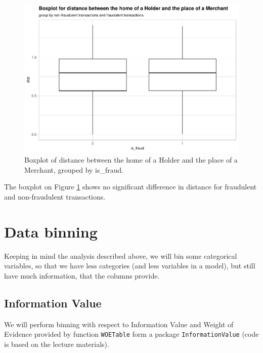 \documentclass[
]{report}
\begin{document}
\begin{figure}
\centering
\includegraphics{credit_card_fraud_detection_files/figure-latex/dist_plot-1.pdf}
\caption{\label{Fig:dist_plot}Boxplot of distance between the home of a
Holder and the place of a Merchant, grouped by is\_fraud.}
\end{figure}

The boxplot on Figure \ref{Fig:dist_plot} shows no significant
difference in distance for fraudulent and non-fraudulent transactions.

\hypertarget{data-binning}{%
\section{Data binning}\label{data-binning}}

Keeping in mind the analysis described above, we will bin some
categorical variables, so that we have less categories (and less
variables in a model), but still have much information, that the columns
provide.

\hypertarget{information-value}{%
\subsection{Information Value}\label{information-value}}

We will perform binning with respect to Information Value and Weight of
Evidence provided by function \texttt{WOETable} form a package
\texttt{InformationValue} (code is based on the lecture materials).
\end{document}
